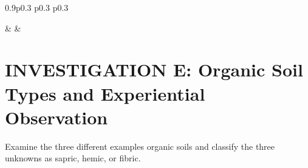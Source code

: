 \documentclass[
  letterpaper,
  twocolumn,
  portrait]{scrbook}
\begin{document}
\begin{table}[h!]
\begin{centerbox}
\begin{threeparttable}
\begin{tabularx}{0.9\textwidth}{p{} p{} p{}}

 &
 &
 \tabularnewline[-0.5pt]


\end{tabularx}
\end{threeparttable}\par\end{centerbox}

\end{table}
 

\hypertarget{investigation-e-organic-soil-types-and-experiential-observation}{%
\section{INVESTIGATION E: Organic Soil Types and Experiential
Observation}\label{investigation-e-organic-soil-types-and-experiential-observation}}

Examine the three different examples organic soils and classify the
three unknowns as sapric, hemic, or fibric.

 
  \providecommand{\huxb}[2]{\arrayrulecolor[RGB]{#1}\global\arrayrulewidth=#2pt}
  \providecommand{\huxvb}[2]{\color[RGB]{#1}\vrule width #2pt}
  \providecommand{\huxtpad}[1]{\rule{0pt}{#1}}
  \providecommand{\huxbpad}[1]{\rule[-#1]{0pt}{#1}}
\end{document}
